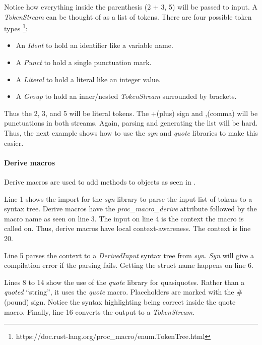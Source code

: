 Notice how everything inside the parenthesis (\colorbox{input}{2 + 3, 5}) will be passed to \colorbox{input}{input}.
A \textit{TokenStream} can be thought of as a list of tokens.
There are four possible token types \footnote{https://doc.rust-lang.org/proc\_macro/enum.TokenTree.html}:

\begin{itemize}
	\item An \textit{Ident} to hold an identifier like a variable name.
	\item A \textit{Punct} to hold a single punctuation mark.
	\item A \textit{Literal} to hold a literal like an integer value.
	\item A \textit{Group} to hold an inner/nested \textit{TokenStream} surrounded by brackets.
\end{itemize}

Thus the 2, 3, and 5 will be literal tokens.
The +(plus) sign and ,(comma) will be punctuations in both streams.
Again, parsing and generating the list will be hard.
Thus, the next example shows how to use the \textit{syn} and \textit{quote} libraries to make this easier.

\paragraph{Derive macros}
Derive macros are used to add methods to objects as seen in .


Line 1 shows the import for the \textit{syn} library to parse the input list of tokens to a syntax tree.
Derive macros have the \textit{proc\_macro\_derive} attribute followed by the macro \colorbox{function}{name} as seen on line 3.
The \colorbox{context}{input} on line 4 is the context the macro is called on.
Thus, derive macros have local context-awareness.
The \colorbox{context}{context} is line 20.

Line 5 parses the context to a \textit{DerivedInput} syntax tree from \textit{syn}.
\textit{Syn} will give a compilation error if the parsing fails.
Getting the struct name happens on line 6.

Lines 8 to 14 show the use of the \textit{quote} library for quasiquotes.
Rather than a \textit{quoted} ``string'', it uses the \textit{quote} macro.
Placeholders are marked with the \# (pound) sign.
Notice the syntax highlighting being correct inside the quote macro.
Finally, line 16 converts the output to a \textit{TokenStream}.

